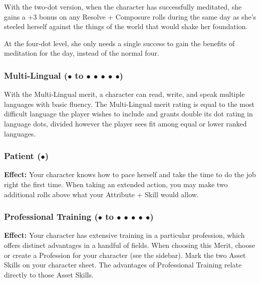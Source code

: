 \documentclass["../Misguided by Starlight.tex"]{subfiles}
\begin{document}
		With the two-dot version, when the character has successfully meditated, she gains a +3 bonus on any Resolve + Composure rolls during the same day as she’s steeled herself against the things of the world that would shake her foundation.

		At the four-dot level, she only needs a single success to gain the benefits of meditation for the day, instead of the normal four.
	
	\subsubsection{Multi-Lingual ($\bullet$ to $\bullet$ $\bullet$ $\bullet$ $\bullet$ $\bullet$)} %
		With the Multi-Lingual merit, a character can read, write, and speak multiple languages with basic fluency. The Multi-Lingual merit rating is equal to the most difficult language the player wishes to include and grants double its dot rating in language dots, divided however the player sees fit among equal or lower ranked languages.
		
	\subsubsection{Patient ($\bullet$)} %
		\textbf{Effect:} Your character knows how to pace herself and take the time to do the job right the first time. When taking an extended action, you may make two additional rolls above what your Attribute + Skill would allow.
	
	\subsubsection{Professional Training ($\bullet$ to $\bullet$ $\bullet$ $\bullet$ $\bullet$ $\bullet$)} %
		\textbf{Effect:} Your character has extensive training in a particular profession, which offers distinct advantages in a handful of fields. When choosing this Merit, choose or create a Profession for your character (see the sidebar). Mark the two Asset Skills on your character sheet. The advantages of Professional Training relate directly to those Asset Skills.
		
\end{document}
